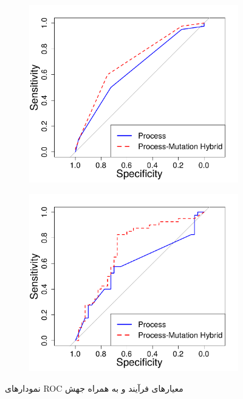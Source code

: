 \begin{figure}[H]
	\begin{subfigure}{.5\textwidth}
		\centering
		\includegraphics[width= \linewidth]{img/evaluation/phase3-roc-lr.pdf}
		\caption{}
	\end{subfigure}
	\begin{subfigure}{.5\textwidth}
		\centering
		\includegraphics[width= \linewidth]{img/evaluation/phase3-roc-nn.pdf}
		\caption{}
	\end{subfigure}
	\caption{نمودارهای ROC معیارهای فرآیند و به همراه جهش}
	\label{fig:ROC-phase3}
\end{figure}

